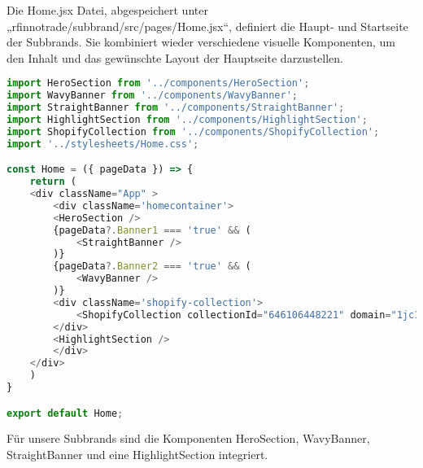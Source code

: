 Die Home.jsx Datei, abgespeichert unter „rfinnotrade/subbrand/src/pages/Home.jsx“, definiert die Haupt- und Startseite der Subbrands. Sie kombiniert wieder verschiedene visuelle Komponenten, um den Inhalt und das gewünschte Layout der Hauptseite darzustellen.

\begin{lstlisting}[language=JavaScript, caption={Home.jsx}, label={lst:homejsx}]
import HeroSection from '../components/HeroSection';
import WavyBanner from '../components/WavyBanner';
import StraightBanner from '../components/StraightBanner';
import HighlightSection from '../components/HighlightSection';
import ShopifyCollection from '../components/ShopifyCollection';
import '../stylesheets/Home.css';

const Home = ({ pageData }) => {  
    return (
    <div className="App" >
        <div className='homecontainer'>
        <HeroSection />
        {pageData?.Banner1 === 'true' && (
            <StraightBanner />
        )}
        {pageData?.Banner2 === 'true' && (
            <WavyBanner />
        )}
        <div className='shopify-collection'> 
            <ShopifyCollection collectionId="646106448221" domain="1jc1dr-i4.myshopify.com" storefrontAccessToken="20858f71b76e268f82b0f33ee6773838" />
        </div>
        <HighlightSection />
        </div>
    </div>  
    )
}

export default Home;
\end{lstlisting}

Für unsere Subbrands sind die Komponenten HeroSection, WavyBanner, StraightBanner und eine HighlightSection integriert.